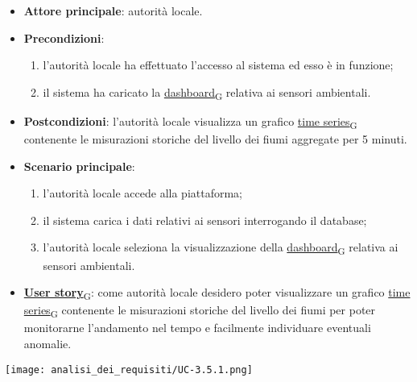 \newpage
{}
\begin{itemize}
	\item \textbf{Attore principale}: autorità locale.
	\item \textbf{Precondizioni}:
	      \begin{enumerate}
		      \item l'autorità locale ha effettuato l'accesso al sistema ed esso è in funzione;
		      \item il sistema ha caricato la \href{https://7last.github.io/docs/pb/documentazione-interna/glossario\#dashboard}{dashboard\textsubscript{G}} relativa ai sensori ambientali.
	      \end{enumerate}
	\item \textbf{Postcondizioni}: l'autorità locale visualizza un grafico \href{https://7last.github.io/docs/pb/documentazione-interna/glossario\#time-series}{time series\textsubscript{G}} contenente le misurazioni storiche
	      del livello dei fiumi aggregate per 5 minuti.
	\item \textbf{Scenario principale}:
	      \begin{enumerate}
		      \item l'autorità locale accede alla piattaforma;
		      \item il sistema carica i dati relativi ai sensori interrogando il database;
		      \item l'autorità locale seleziona la visualizzazione della \href{https://7last.github.io/docs/pb/documentazione-interna/glossario\#dashboard}{dashboard\textsubscript{G}} relativa ai sensori ambientali.
	      \end{enumerate}
	\item \href{https://7last.github.io/docs/pb/documentazione-interna/glossario\#user-story}{\textbf{User story}\textsubscript{G}}:
	      come autorità locale desidero poter visualizzare un grafico \href{https://7last.github.io/docs/pb/documentazione-interna/glossario\#time-series}{time series\textsubscript{G}} contenente le misurazioni storiche
	      del livello dei fiumi per poter monitorarne l'andamento nel tempo e facilmente individuare eventuali anomalie.
\end{itemize}
\begin{center}
	\texttt{[image: analisi\_dei\_requisiti/UC-3.5.1.png]}
\end{center}

